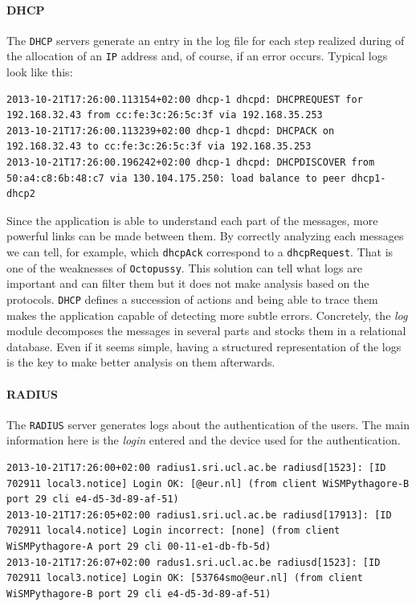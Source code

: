 \paragraph{DHCP}
The \texttt{DHCP} servers generate an entry in the log file for each step realized during of the allocation of an \texttt{IP} address and, of course, if an error occurs. Typical logs look like this:
\begin{lstlisting}[frame=single,breaklines=true,caption={\texttt{DHCP} logs}]
2013-10-21T17:26:00.113154+02:00 dhcp-1 dhcpd: DHCPREQUEST for 192.168.32.43 from cc:fe:3c:26:5c:3f via 192.168.35.253
2013-10-21T17:26:00.113239+02:00 dhcp-1 dhcpd: DHCPACK on 192.168.32.43 to cc:fe:3c:26:5c:3f via 192.168.35.253
2013-10-21T17:26:00.196242+02:00 dhcp-1 dhcpd: DHCPDISCOVER from 50:a4:c8:6b:48:c7 via 130.104.175.250: load balance to peer dhcp1-dhcp2
\end{lstlisting}
Since the application is able to understand each part of the messages, more powerful links can be made between them. By correctly analyzing each messages we can tell, for example, which \texttt{dhcpAck} correspond to a \texttt{dhcpRequest}. That is one of the weaknesses of \texttt{Octopussy}. This solution can tell what logs are important and can filter them but it does not make analysis based on the protocols. \texttt{DHCP} defines a succession of actions and being able to trace them makes the application capable of detecting more subtle errors. Concretely, the \emph{log} module decomposes the messages in several parts and stocks them in a relational database. Even if it seems simple, having a structured representation of the logs is the key to make better analysis on them afterwards.


\paragraph{RADIUS}
The \texttt{RADIUS} server generates logs about the authentication of the users. The main information here is the \emph{login} entered and the device used for the authentication.

\begin{lstlisting}[frame=single,breaklines=true,caption={\texttt{RADIUS} logs}]
2013-10-21T17:26:00+02:00 radius1.sri.ucl.ac.be radiusd[1523]: [ID 702911 local3.notice] Login OK: [@eur.nl] (from client WiSMPythagore-B port 29 cli e4-d5-3d-89-af-51)
2013-10-21T17:26:05+02:00 radius1.sri.ucl.ac.be radiusd[17913]: [ID 702911 local4.notice] Login incorrect: [none] (from client WiSMPythagore-A port 29 cli 00-11-e1-db-fb-5d)
2013-10-21T17:26:07+02:00 radus1.sri.ucl.ac.be radiusd[1523]: [ID 702911 local3.notice] Login OK: [53764smo@eur.nl] (from client WiSMPythagore-B port 29 cli e4-d5-3d-89-af-51)
\end{lstlisting}

